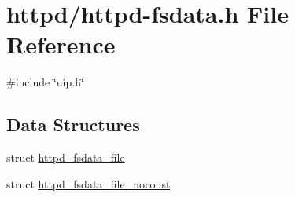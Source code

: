 \hypertarget{httpd-fsdata_8h}{
\section{httpd/httpd-\/fsdata.h File Reference}
\label{httpd-fsdata_8h}
}
{\ttfamily \#include \char`\"{}uip.h\char`\"{}}\par
\subsection*{Data Structures}
\begin{DoxyCompactItemize}
\item 
struct \hyperlink{structhttpd__fsdata__file}{httpd\_\-fsdata\_\-file}
\item 
struct \hyperlink{structhttpd__fsdata__file__noconst}{httpd\_\-fsdata\_\-file\_\-noconst}
\end{DoxyCompactItemize}
